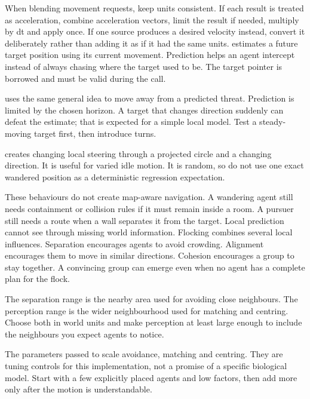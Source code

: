\documentclass[11pt,a4paper]{article}
\begin{document}
When blending movement requests, keep units consistent. If each result is treated as acceleration, combine acceleration vectors, limit the result if needed, multiply by dt and apply once. If one source produces a desired velocity instead, convert it deliberately rather than adding it as if it had the same units.
 estimates a future target position using its current movement. Prediction helps an agent intercept instead of always chasing where the target used to be. The target pointer is borrowed and must be valid during the call.

 uses the same general idea to move away from a predicted threat. Prediction is limited by the chosen horizon. A target that changes direction suddenly can defeat the estimate; that is expected for a simple local model. Test a steady-moving target first, then introduce turns.

 creates changing local steering through a projected circle and a changing direction. It is useful for varied idle motion. It is random, so do not use one exact wandered position as a deterministic regression expectation.

These behaviours do not create map-aware navigation. A wandering agent still needs containment or collision rules if it must remain inside a room. A pursuer still needs a route when a wall separates it from the target. Local prediction cannot see through missing world information.
Flocking combines several local influences. Separation encourages agents to avoid crowding. Alignment encourages them to move in similar directions. Cohesion encourages a group to stay together. A convincing group can emerge even when no agent has a complete plan for the flock.

The separation range is the nearby area used for avoiding close neighbours. The perception range is the wider neighbourhood used for matching and centring. Choose both in world units and make perception at least large enough to include the neighbours you expect agents to notice.

The parameters passed to  scale avoidance, matching and centring. They are tuning controls for this implementation, not a promise of a specific biological model. Start with a few explicitly placed agents and low factors, then add more only after the motion is understandable.
\end{document}
